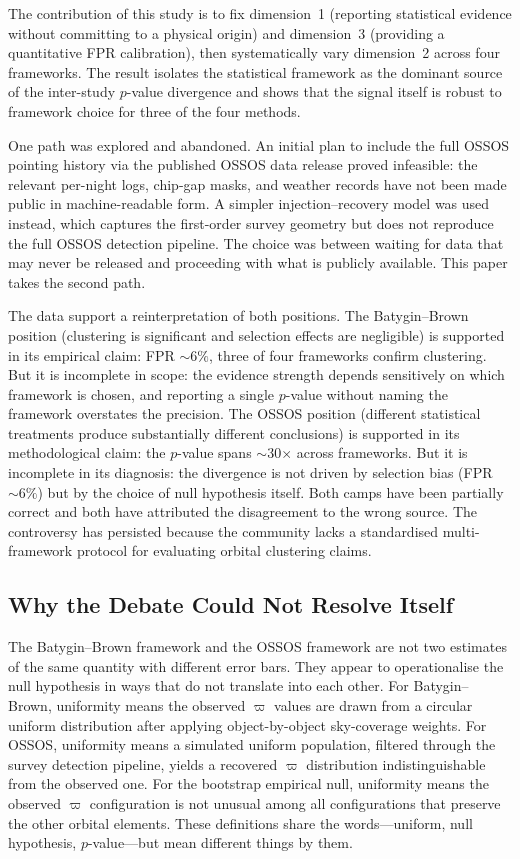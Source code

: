\documentclass[usenatbib]{mnras}
\begin{document}
The contribution of this study is to fix dimension~1 (reporting statistical evidence without committing to a physical origin) and dimension~3 (providing a quantitative FPR calibration), then systematically vary dimension~2 across four frameworks. The result isolates the statistical framework as the dominant source of the inter-study $p$-value divergence and shows that the signal itself is robust to framework choice for three of the four methods.

One path was explored and abandoned. An initial plan to include the full OSSOS pointing history via the published OSSOS data release proved infeasible: the relevant per-night logs, chip-gap masks, and weather records have not been made public in machine-readable form. A simpler injection--recovery model was used instead, which captures the first-order survey geometry but does not reproduce the full OSSOS detection pipeline. The choice was between waiting for data that may never be released and proceeding with what is publicly available. This paper takes the second path.

The data support a reinterpretation of both positions. The Batygin--Brown position (clustering is significant and selection effects are negligible) is supported in its empirical claim: FPR $\sim6\%$, three of four frameworks confirm clustering. But it is incomplete in scope: the evidence strength depends sensitively on which framework is chosen, and reporting a single $p$-value without naming the framework overstates the precision. The OSSOS position (different statistical treatments produce substantially different conclusions) is supported in its methodological claim: the $p$-value spans $\sim$30$\times$ across frameworks. But it is incomplete in its diagnosis: the divergence is not driven by selection bias (FPR $\sim6\%$) but by the choice of null hypothesis itself. Both camps have been partially correct and both have attributed the disagreement to the wrong source. The controversy has persisted because the community lacks a standardised multi-framework protocol for evaluating orbital clustering claims.

\subsection{Why the Debate Could Not Resolve Itself}

The Batygin--Brown framework and the OSSOS framework are not two estimates of the same quantity with different error bars. They appear to operationalise the null hypothesis in ways that do not translate into each other. For Batygin--Brown, uniformity means the observed $\varpi$ values are drawn from a circular uniform distribution after applying object-by-object sky-coverage weights. For OSSOS, uniformity means a simulated uniform population, filtered through the survey detection pipeline, yields a recovered $\varpi$ distribution indistinguishable from the observed one. For the bootstrap empirical null, uniformity means the observed $\varpi$ configuration is not unusual among all configurations that preserve the other orbital elements. These definitions share the words---uniform, null hypothesis, $p$-value---but mean different things by them.
\end{document}
